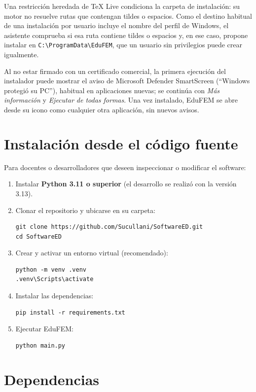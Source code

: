 Una restricción heredada de \TeX{} Live condiciona la carpeta de instalación: su motor no resuelve rutas que contengan tildes o espacios. Como el destino habitual de una instalación por usuario incluye el nombre del perfil de Windows, el asistente comprueba si esa ruta contiene tildes o espacios y, en ese caso, propone instalar en \texttt{C:\textbackslash ProgramData\textbackslash EduFEM}, que un usuario sin privilegios puede crear igualmente.

Al no estar firmado con un certificado comercial, la primera ejecución del instalador puede mostrar el aviso de Microsoft Defender SmartScreen (\enquote{Windows protegió su PC}), habitual en aplicaciones nuevas; se continúa con \emph{Más información} y \emph{Ejecutar de todas formas}. Una vez instalado, EduFEM se abre desde su icono como cualquier otra aplicación, sin nuevos avisos.

\section{Instalación desde el código fuente}

Para docentes o desarrolladores que deseen inspeccionar o modificar el software:

\begin{enumerate}
    \item Instalar \textbf{Python 3.11 o superior} (el desarrollo se realizó con la versión 3.13).
    \item Clonar el repositorio y ubicarse en su carpeta:
\begin{verbatim}
git clone https://github.com/Sucullani/SoftwareED.git
cd SoftwareED
\end{verbatim}
    \item Crear y activar un entorno virtual (recomendado):
\begin{verbatim}
python -m venv .venv
.venv\Scripts\activate
\end{verbatim}
    \item Instalar las dependencias:
\begin{verbatim}
pip install -r requirements.txt
\end{verbatim}
    \item Ejecutar EduFEM:
\begin{verbatim}
python main.py
\end{verbatim}
\end{enumerate}

\section{Dependencias}

